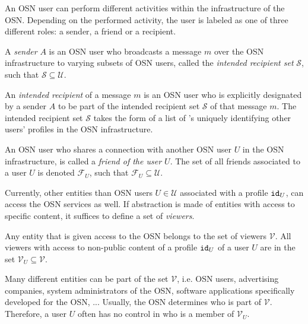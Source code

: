 An OSN user can perform different activities within the infrastructure of the OSN. Depending on the performed activity, the user is labeled as one of three different roles: a sender, a friend or a recipient.

\begin{defn}[Sender]
\label{def:sender}
 A \textit{sender} $A$ is an OSN user who broadcasts a message $m$ over the OSN infrastructure to varying subsets of OSN users, called the \textit{intended recipient set} $\mathcal{S}$, such that $\mathcal{S} \subseteq \mathcal{U}$.
\end{defn}

\begin{defn}
\label{def:recipient}
 An \textit{intended recipient} of a message $m$ is an OSN user who is explicitly designated by a sender $A$ to be part of the intended recipient set $\mathcal{S}$ of that message $m$. The intended recipient set $\mathcal{S}$ takes the form of a list of \id{}'s uniquely identifying other users' profiles in the OSN infrastructure.
\end{defn}

\begin{defn}[Friend]
\label{def:friend}
 An OSN user who shares a connection with another OSN user $U$ in the OSN infrastructure, is called a \textit{friend of the user $U$}. The set of all friends associated to a user $U$ is denoted $\mathcal{F}_U$, such that $\mathcal{F}_U \subseteq \mathcal{U}$.
\end{defn}

Currently, other entities than OSN users $U \in \mathcal{U}$ associated with a profile $\mathtt{id}_{U}$, can access the OSN services as well. If abstraction is made of entities with access to specific content, it suffices to define a set of \textit{viewers}.

\begin{defn}[Viewer]
\label{def:viewer}
 Any entity that is given access to the OSN belongs to the set of viewers $\mathcal{V}$. All viewers with access to non-public content of a profile $\mathtt{id}_{U}$ of a user $U$ are in the set $\mathcal{V}_U \subseteq \mathcal{V}$.
\end{defn}

Many different entities can be part of the set $\mathcal{V}$, i.e. OSN users, advertising companies, system administrators of the OSN, software applications specifically developed for the OSN, ... Usually, the OSN determines who is part of $\mathcal{V}$. Therefore, a user $U$ often has no control in who is a member of $\mathcal{V}_U$.

